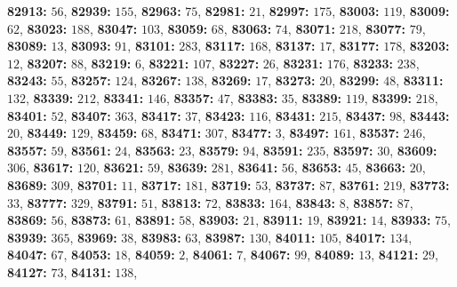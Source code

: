 \textsf{\bfseries 82913:} $56$, \textsf{\bfseries 82939:} $155$, \textsf{\bfseries 82963:} $75$, \textsf{\bfseries 82981:} $21$, \textsf{\bfseries 82997:} $175$, \textsf{\bfseries 83003:} $119$, \textsf{\bfseries 83009:} $62$, \textsf{\bfseries 83023:} $188$, \textsf{\bfseries 83047:} $103$, \textsf{\bfseries 83059:} $68$, \textsf{\bfseries 83063:} $74$, \textsf{\bfseries 83071:} $218$, \textsf{\bfseries 83077:} $79$, \textsf{\bfseries 83089:} $13$, \textsf{\bfseries 83093:} $91$, \textsf{\bfseries 83101:} $283$, \textsf{\bfseries 83117:} $168$, \textsf{\bfseries 83137:} $17$, \textsf{\bfseries 83177:} $178$, \textsf{\bfseries 83203:} $12$, \textsf{\bfseries 83207:} $88$, \textsf{\bfseries 83219:} $6$, \textsf{\bfseries 83221:} $107$, \textsf{\bfseries 83227:} $26$, \textsf{\bfseries 83231:} $176$, \textsf{\bfseries 83233:} $238$, \textsf{\bfseries 83243:} $55$, \textsf{\bfseries 83257:} $124$, \textsf{\bfseries 83267:} $138$, \textsf{\bfseries 83269:} $17$, \textsf{\bfseries 83273:} $20$, \textsf{\bfseries 83299:} $48$, \textsf{\bfseries 83311:} $132$, \textsf{\bfseries 83339:} $212$, \textsf{\bfseries 83341:} $146$, \textsf{\bfseries 83357:} $47$, \textsf{\bfseries 83383:} $35$, \textsf{\bfseries 83389:} $119$, \textsf{\bfseries 83399:} $218$, \textsf{\bfseries 83401:} $52$, \textsf{\bfseries 83407:} $363$, \textsf{\bfseries 83417:} $37$, \textsf{\bfseries 83423:} $116$, \textsf{\bfseries 83431:} $215$, \textsf{\bfseries 83437:} $98$, \textsf{\bfseries 83443:} $20$, \textsf{\bfseries 83449:} $129$, \textsf{\bfseries 83459:} $68$, \textsf{\bfseries 83471:} $307$, \textsf{\bfseries 83477:} $3$, \textsf{\bfseries 83497:} $161$, \textsf{\bfseries 83537:} $246$, \textsf{\bfseries 83557:} $59$, \textsf{\bfseries 83561:} $24$, \textsf{\bfseries 83563:} $23$, \textsf{\bfseries 83579:} $94$, \textsf{\bfseries 83591:} $235$, \textsf{\bfseries 83597:} $30$, \textsf{\bfseries 83609:} $306$, \textsf{\bfseries 83617:} $120$, \textsf{\bfseries 83621:} $59$, \textsf{\bfseries 83639:} $281$, \textsf{\bfseries 83641:} $56$, \textsf{\bfseries 83653:} $45$, \textsf{\bfseries 83663:} $20$, \textsf{\bfseries 83689:} $309$, \textsf{\bfseries 83701:} $11$, \textsf{\bfseries 83717:} $181$, \textsf{\bfseries 83719:} $53$, \textsf{\bfseries 83737:} $87$, \textsf{\bfseries 83761:} $219$, \textsf{\bfseries 83773:} $33$, \textsf{\bfseries 83777:} $329$, \textsf{\bfseries 83791:} $51$, \textsf{\bfseries 83813:} $72$, \textsf{\bfseries 83833:} $164$, \textsf{\bfseries 83843:} $8$, \textsf{\bfseries 83857:} $87$, \textsf{\bfseries 83869:} $56$, \textsf{\bfseries 83873:} $61$, \textsf{\bfseries 83891:} $58$, \textsf{\bfseries 83903:} $21$, \textsf{\bfseries 83911:} $19$, \textsf{\bfseries 83921:} $14$, \textsf{\bfseries 83933:} $75$, \textsf{\bfseries 83939:} $365$, \textsf{\bfseries 83969:} $38$, \textsf{\bfseries 83983:} $63$, \textsf{\bfseries 83987:} $130$, \textsf{\bfseries 84011:} $105$, \textsf{\bfseries 84017:} $134$, \textsf{\bfseries 84047:} $67$, \textsf{\bfseries 84053:} $18$, \textsf{\bfseries 84059:} $2$, \textsf{\bfseries 84061:} $7$, \textsf{\bfseries 84067:} $99$, \textsf{\bfseries 84089:} $13$, \textsf{\bfseries 84121:} $29$, \textsf{\bfseries 84127:} $73$, \textsf{\bfseries 84131:} $138$, 
